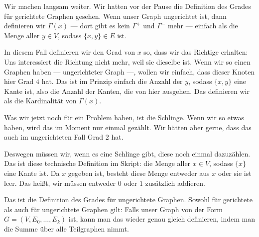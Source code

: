 \begin{spoken-clean}[00:45:02 - 00:47:12]
Wir machen langsam weiter. Wir hatten vor der Pause die Definition des Grades für gerichtete Graphen gesehen. Wenn unser Graph ungerichtet ist, dann definieren wir $\Gamma(x)$ --- dort gibt es kein $\Gamma^+$ und $\Gamma^-$ mehr --- einfach als die Menge aller $y \in V$, sodass $\{x, y\} \in E$ ist.

In diesem Fall definieren wir den Grad von $x$ so, dass wir das Richtige erhalten: Uns interessiert die Richtung nicht mehr, weil sie dieselbe ist. Wenn wir so einen Graphen haben --- ungerichteter Graph ---, wollen wir einfach, dass dieser Knoten hier Grad $4$ hat. Das ist im Prinzip einfach die Anzahl der $y$, sodass $\{x, y\}$ eine Kante ist, also die Anzahl der Kanten, die von hier ausgehen. Das definieren wir als die Kardinalität von $\Gamma(x)$.
\end{spoken-clean}

\begin{spoken-clean}[00:47:12 - 00:49:12]
Was wir jetzt noch für ein Problem haben, ist die Schlinge. Wenn wir so etwas haben, wird das im Moment nur einmal gezählt. Wir hätten aber gerne, dass das auch im ungerichteten Fall Grad $2$ hat.

Deswegen müssen wir, wenn es eine Schlinge gibt, diese noch einmal dazuzählen. Das ist diese technische Definition im Skript: die Menge aller $x \in V$, sodass $\{x\}$ eine Kante ist. Da $x$ gegeben ist, besteht diese Menge entweder aus $x$ oder sie ist leer. Das heißt, wir müssen entweder $0$ oder $1$ zusätzlich addieren.

Das ist die Definition des Grades für ungerichtete Graphen. Sowohl für gerichtete als auch für ungerichtete Graphen gilt: Falls unser Graph von der Form $G = (V, E_0, \dots, E_k)$ ist, kann man das wieder genau gleich definieren, indem man die Summe über alle Teilgraphen nimmt.
\end{spoken-clean}

